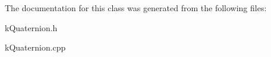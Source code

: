 The documentation for this class was generated from the following files\+:\begin{DoxyCompactItemize}
\item 
k\+Quaternion.\+h\item 
k\+Quaternion.\+cpp\end{DoxyCompactItemize}
